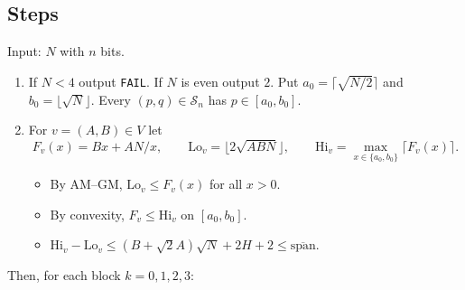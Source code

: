 \documentclass[11pt]{amsart}
\theoremstyle{definition}
\newcommand{\Sn}{\mathcal{S}_n}
\newcommand{\spanbar}{\overline{\mathrm{span}}}
\begin{document}
\subsection{Steps}
Input: $N$ with $n$ bits.
\begin{enumerate}[label=\arabic*.]
\item If $N<4$ output \texttt{FAIL}. If $N$ is even output $2$. Put
  $a_0=\lceil\sqrt{N/2}\rceil$ and $b_0=\lfloor\sqrt N\rfloor$. Every $(p,q)\in\Sn$ has
  $p\in[a_0,b_0]$.
\item For $v=(A,B)\in V$ let
  \[F_v(x)=Bx+AN/x,\qquad \mathrm{Lo}_v=\lfloor2\sqrt{ABN}\rfloor,\qquad
  \mathrm{Hi}_v=\max_{x\in\{a_0,b_0\}}\lceil F_v(x)\rceil.\]
  \begin{itemize}
  \item By AM--GM, $\mathrm{Lo}_v\le F_v(x)$ for all $x>0$.
  \item By convexity, $F_v\le\mathrm{Hi}_v$ on $[a_0,b_0]$.
  \item $\mathrm{Hi}_v-\mathrm{Lo}_v\le(B+\sqrt2A)\sqrt N+2H+2\le\spanbar$.
  \end{itemize}
\end{enumerate}
Then, for each block $k=0,1,2,3$:
\end{document}

